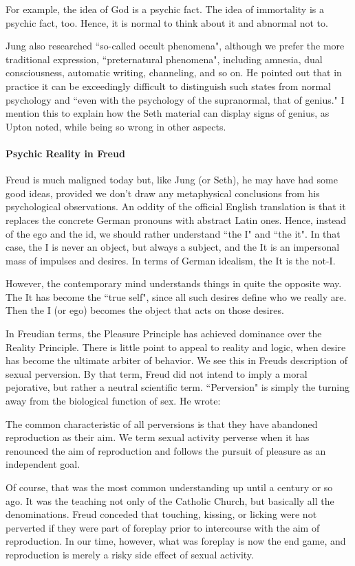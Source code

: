 For example, the idea of God is a psychic fact. The idea of immortality is a psychic fact, too. Hence, it is normal to think about it and abnormal not to.

Jung also researched ``so-called occult phenomena", although we prefer the more traditional expression, ``preternatural phenomena", including amnesia, dual consciousness, automatic writing, channeling, and so on. He pointed out that in practice it can be exceedingly difficult to distinguish such states from normal psychology and ``even with the psychology of the supranormal, that of genius." I mention this to explain how the Seth material can display signs of genius, as Upton noted, while being so wrong in other aspects.

\paragraph{Psychic Reality in Freud}
Freud is much maligned today but, like Jung (or Seth), he may have had some good ideas, provided we don't draw any metaphysical conclusions from his psychological observations. An oddity of the official English translation is that it replaces the concrete German pronouns with abstract Latin ones. Hence, instead of the ego and the id, we should rather understand ``the I" and ``the it". In that case, the I is never an object, but always a subject, and the It is an impersonal mass of impulses and desires. In terms of German idealism, the It is the not-I.

However, the contemporary mind understands things in quite the opposite way. The It has become the ``true self", since all such desires define who we really are. Then the I (or ego) becomes the object that acts on those desires.

In Freudian terms, the Pleasure Principle has achieved dominance over the Reality Principle. There is little point to appeal to reality and logic, when desire has become the ultimate arbiter of behavior. We see this in Freuds description of sexual perversion. By that term, Freud did not intend to imply a moral pejorative, but rather a neutral scientific term. ``Perversion" is simply the turning away from the biological function of sex. He wrote:

\begin{quotex}
The common characteristic of all perversions is that they have abandoned reproduction as their aim. We term sexual activity perverse when it has renounced the aim of reproduction and follows the pursuit of pleasure as an independent goal. 

\end{quotex}
Of course, that was the most common understanding up until a century or so ago. It was the teaching not only of the Catholic Church, but basically all the denominations. Freud conceded that touching, kissing, or licking were not perverted if they were part of foreplay prior to intercourse with the aim of reproduction. In our time, however, what was foreplay is now the end game, and reproduction is merely a risky side effect of sexual activity.

